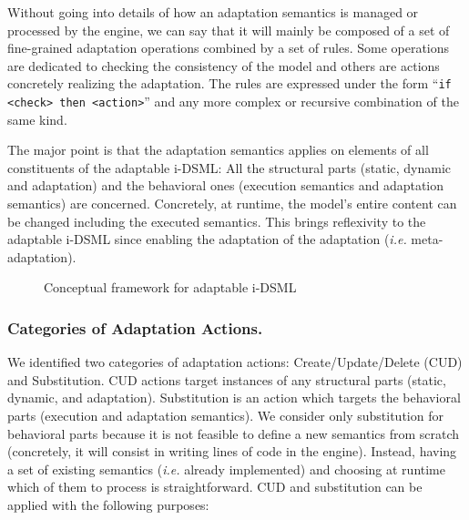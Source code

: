 \documentclass[english, 10pt]{llncs}
\begin{document}
Without going into details of how an adaptation semantics is managed
or processed by the engine, we can say that it will mainly be composed
of a set of fine-grained adaptation operations combined by a set of
rules. Some operations are dedicated to checking the consistency of
the model and others are actions concretely realizing the
adaptation. The rules are expressed under the form
``\texttt{if <check> then <action>}'' and any more complex or
recursive combination of the same kind.

The major point is that the adaptation semantics applies on elements
of all constituents of the adaptable i-DSML: All the structural parts
(static, dynamic and adaptation) and the behavioral ones (execution
semantics and adaptation semantics) are concerned. Concretely, at
runtime, the model's entire content can be changed including the
executed semantics. This brings reflexivity to the adaptable i-DSML
since enabling the adaptation of the adaptation (\textit{i.e.}
meta-adaptation).

\begin{figure}[htbp]
\begin{center}
\caption{Conceptual framework for adaptable i-DSML}
\label{adapt-iDSML}
\end{center}
\end{figure}


\subsubsection{Categories of Adaptation Actions.}

We identified two categories of adaptation actions:
Create/Update/Delete (CUD) and Substitution. CUD actions target
instances of any structural parts (static, dynamic, and adaptation).
Substitution is an action which targets the behavioral parts
(execution and adaptation semantics). We consider only substitution
for behavioral parts because it is not feasible to define a new
semantics from scratch (concretely, it will consist in writing lines
of code in the engine). Instead, having a set of existing semantics
(\textit{i.e.} already implemented) and choosing at runtime which of
them to process is straightforward. CUD and substitution can be
applied with the following purposes:
\end{document}
